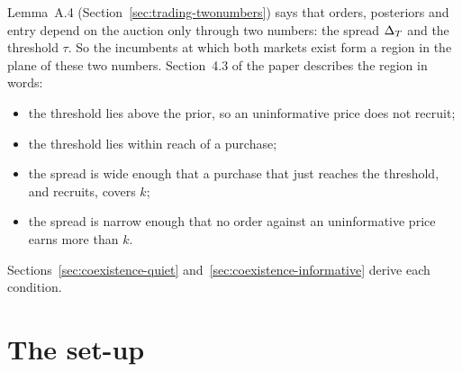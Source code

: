 Lemma~A.4 (Section~\ref{sec:trading-twonumbers}) says that orders, posteriors and entry depend on the auction only
through two numbers: the spread \(\Delta_T\) and the threshold \(\tau\). So the incumbents at which both markets exist form
a region in the plane of these two numbers. Section~4.3 of the paper describes the region in words:
\begin{itemize}
\item the threshold lies above the prior, so an uninformative price does not recruit;
\item the threshold lies within reach of a purchase;
\item the spread is wide enough that a purchase that just reaches the threshold, and recruits, covers \(k\);
\item the spread is narrow enough that no order against an uninformative price earns more than \(k\).
\end{itemize}
Sections~\ref{sec:coexistence-quiet} and~\ref{sec:coexistence-informative} derive each condition.

\section{The set-up}\label{sec:coexistence-setup}

